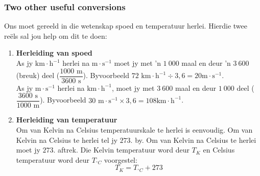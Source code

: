 \subsubsection*{Two other useful conversions}
            \nopagebreak
Ons moet gereeld in die wetenskap spoed en temperatuur herlei. Hierdie twee reëls sal jou help om dit te doen:
\begin{enumerate}[label=\textbf{\arabic*}.]
\item \textbf{Herleiding van spoed}\\
As jy $\text{km} \cdot \text{h}^{-1}$ herlei na $\text{m} \cdot \text{s}^{-1}$ moet jy met 'n $1~000$ maal en deur 'n $3~600$ (breuk) deel ($\dfrac{1000 \text{ m}}{3600 \text{ s}}$). Byvoorbeeld $72 \text{ km} \cdot \text{h}^{-1} \div 3,6 = 20 \text{m}\cdot \text{s}^{-1}$.\\  
As jy $\text{m}\cdot \text{s}^{-1}$ herlei na $\text{km} \cdot \text{h}^{-1}$, moet jy met $3~600$ maal en deur $1~000$ deel ($\dfrac{3600 \text{ s}}{1000 \text{ m}}$). Byvoorbeeld $30 \text{ m}\cdot \text{s}^{-1} \times 3,6 = 108 \text{km} \cdot \text{h}^{-1}$. 
\item \textbf{Herleiding van temperatuur}\\
Om van Kelvin na Celsius temperatuurskale te herlei is eenvoudig. Om van Kelvin na Celsius te herlei tel jy $273$. by. Om van Kelvin na Celsius te herlei moet jy $273$. aftrek. Die Kelvin temperatuur word deur ${T}_{K}$ en Celsius temperatuur word deur ${T}_{^{\circ}C}$ voorgestel:         
    \begin{equation*}
    {T}_{K}={T}_{^{\circ}C} + 273
      \end{equation*}
\end{enumerate}

